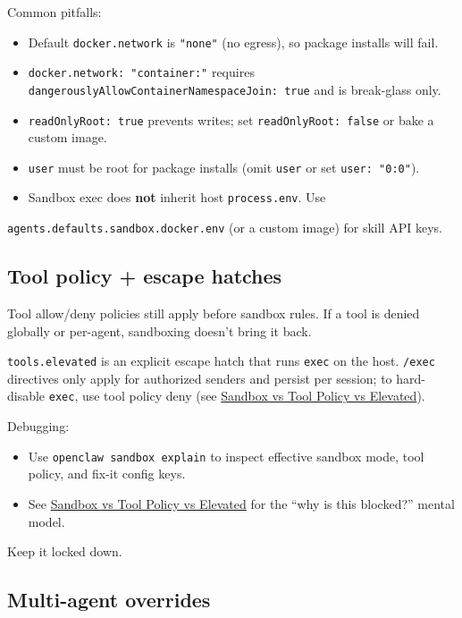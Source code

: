 Common pitfalls:

\begin{itemize}
  \item Default \texttt{docker.network} is \texttt{"none"} (no egress), so package installs will fail.
  \item \texttt{docker.network: "container:"} requires \texttt{dangerouslyAllowContainerNamespaceJoin: true} and is break-glass only.
  \item \texttt{readOnlyRoot: true} prevents writes; set \texttt{readOnlyRoot: false} or bake a custom image.
  \item \texttt{user} must be root for package installs (omit \texttt{user} or set \texttt{user: "0:0"}).
  \item Sandbox exec does \textbf{not} inherit host \texttt{process.env}. Use
\end{itemize}

\texttt{agents.defaults.sandbox.docker.env} (or a custom image) for skill API keys.

\subsection{Tool policy + escape hatches}


Tool allow/deny policies still apply before sandbox rules. If a tool is denied
globally or per-agent, sandboxing doesn’t bring it back.

\texttt{tools.elevated} is an explicit escape hatch that runs \texttt{exec} on the host.
\texttt{/exec} directives only apply for authorized senders and persist per session; to hard-disable
\texttt{exec}, use tool policy deny (see \href{/gateway/sandbox-vs-tool-policy-vs-elevated}{Sandbox vs Tool Policy vs Elevated}).

Debugging:

\begin{itemize}
  \item Use \texttt{openclaw sandbox explain} to inspect effective sandbox mode, tool policy, and fix-it config keys.
  \item See \href{/gateway/sandbox-vs-tool-policy-vs-elevated}{Sandbox vs Tool Policy vs Elevated} for the “why is this blocked?” mental model.
\end{itemize}

Keep it locked down.

\subsection{Multi-agent overrides}


